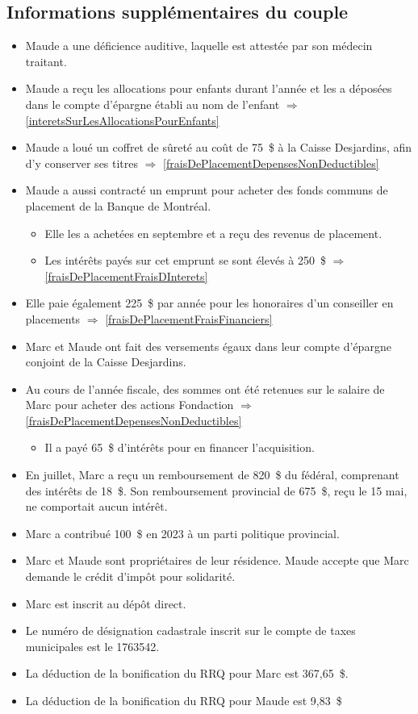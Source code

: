 \subsection{Informations supplémentaires du couple}
\begin{itemize}
	\item Maude a une déficience auditive, laquelle est attestée par son médecin traitant.
	\item Maude a reçu les allocations pour enfants durant l'année et les a déposées dans le compte d'épargne établi au nom de l'enfant $\Rightarrow$ \ref{interetsSurLesAllocationsPourEnfants}
	\item Maude a loué un coffret de sûreté au coût de 75~\$ à la Caisse Desjardins, afin d'y conserver ses titres $\Rightarrow$ \ref{fraisDePlacementDepensesNonDeductibles}
	\item Maude a aussi contracté un emprunt pour acheter des fonds communs de placement de la Banque de Montréal.
	\begin{itemize}
		\item Elle les a achetées en septembre et a reçu des revenus de placement.
		\item Les intérêts payés sur cet emprunt se sont élevés à 250~\$ $\Rightarrow$ \ref{fraisDePlacementFraisDInterets}
	\end{itemize}
	\item Elle paie également 225~\$ par année pour les honoraires d'un conseiller en placements $\Rightarrow$ \ref{fraisDePlacementFraisFinanciers}
	\item Marc et Maude ont fait des versements égaux dans leur compte d'épargne conjoint de la Caisse Desjardins.
	\item Au cours de l'année fiscale, des sommes ont été retenues sur le salaire de Marc pour acheter des actions Fondaction $\Rightarrow$ \ref{fraisDePlacementDepensesNonDeductibles}
	\begin{itemize}
		\item Il a payé 65~\$ d'intérêts pour en financer l'acquisition.
	\end{itemize}
	\item En juillet, Marc a reçu un remboursement de 820~\$ du fédéral, comprenant des intérêts de 18~\$. Son remboursement provincial de 675~\$, reçu le 15 mai, ne comportait aucun intérêt.
	\item Marc a contribué 100~\$ en 2023 à un parti politique provincial.
	\item Marc et Maude sont propriétaires de leur résidence. Maude accepte que Marc demande le crédit d'impôt pour solidarité.
	\item Marc est inscrit au dépôt direct.
	\item Le numéro de désignation cadastrale inscrit sur le compte de taxes municipales est le 1763542.
	\item La déduction de la bonification du RRQ pour Marc est 367,65~\$.
	\item La déduction de la bonification du RRQ pour Maude est 9,83~\$
\end{itemize}

